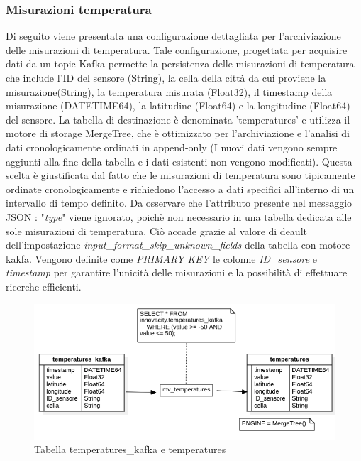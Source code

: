 
    \subsubsection{Misurazioni temperatura} \label{sec:tab_temperatures}
    Di seguito viene presentata una configurazione dettagliata per l'archiviazione delle misurazioni di temperatura. Tale configurazione, progettata per acquisire dati da un topic Kafka permette la persistenza delle misurazioni di temperatura che include l'ID del sensore (String), la cella della città da cui proviene la misurazione(String), la temperatura misurata (Float32), il timestamp della misurazione (DATETIME64), la latitudine (Float64) e la longitudine (Float64) del sensore. La tabella di destinazione è denominata 'temperatures' e utilizza il motore di storage MergeTree, che è ottimizzato per l'archiviazione e l'analisi di dati cronologicamente ordinati in append-only (I nuovi dati vengono sempre aggiunti alla fine della tabella e i dati esistenti non vengono modificati). Questa scelta è giustificata dal fatto che le misurazioni di temperatura sono tipicamente ordinate cronologicamente e richiedono l'accesso a dati specifici all'interno di un intervallo di tempo definito.
    Da osservare che l'attributo presente nel messaggio JSON : "\textit{type}" viene ignorato, poichè non necessario in una tabella dedicata alle sole misurazioni di temperatura. Ciò accade grazie al valore di deault dell'impostazione \textit{input\_format\_skip\_unknown\_fields} della tabella con motore kakfa.
    Vengono definite come \textit{PRIMARY KEY} le colonne \textit{ID\_sensore} e \textit{timestamp} per garantire l'unicità delle misurazioni e la possibilità di effettuare ricerche efficienti.

    \begin{figure}[H]
        \centering
        \includegraphics[width=1\textwidth]{../Images/SpecificaTecnica/temperatures.png}
        \caption{Tabella temperatures\_kafka e temperatures}
        \label{fig:temperatures}
      \end{figure}
    

